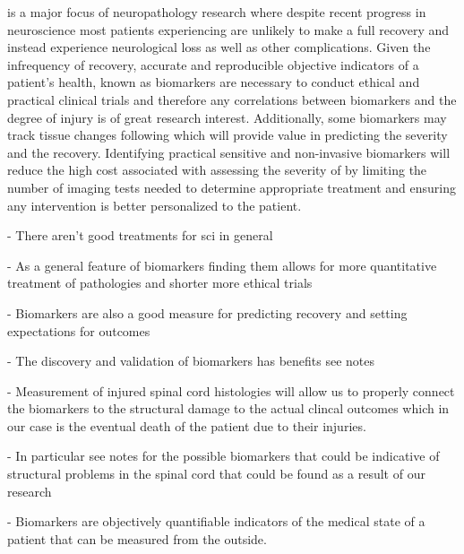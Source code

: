 
\sci is a major focus of neuropathology research where despite recent progress in neuroscience most patients experiencing \sci are unlikely to make a full recovery and instead experience neurological loss as well as other complications. Given the infrequency of recovery, accurate and reproducible objective indicators of a patient's health, known as biomarkers are necessary to conduct ethical and practical clinical trials and therefore any correlations between biomarkers and the degree of injury is of great research interest. Additionally, some biomarkers may track tissue changes following \sci which will provide value in predicting the severity and the recovery. \cite{hulme2017developing} Identifying practical sensitive and non-invasive biomarkers will reduce the high cost associated with assessing the severity of \sci by limiting the number of imaging tests needed to determine appropriate treatment and ensuring any intervention is better personalized to the patient. \cite{badhiwala2018review}

- There aren't good treatments for sci in general %

- As a general feature of biomarkers finding them allows for more quantitative treatment of pathologies and shorter more ethical trials%

- Biomarkers are also a good measure for predicting recovery and setting expectations for outcomes%

- The discovery and validation of biomarkers has benefits see notes%

- Measurement of injured spinal cord histologies will allow us to properly connect the biomarkers to the structural damage to the actual clincal outcomes which in our case is the eventual death of the patient due to their injuries.%

- In particular see notes for the possible biomarkers that could be indicative of structural problems in the spinal cord that could be found as a result of our research%

- Biomarkers are objectively quantifiable indicators of the medical state of a patient that can be measured from the outside.
\fi%


